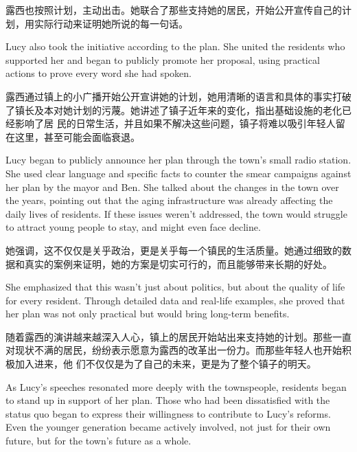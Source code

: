 露西也按照计划，主动出击。她联合了那些支持她的居民，开始公开宣传自己的计划，用实际行动来证明她所说的每一句话。

\begin{flushright}
    Lucy also took the initiative according to the plan. She united the residents
    who supported her and began to publicly promote her proposal, using practical
    actions to prove every word she had spoken.
\end{flushright}

露西通过镇上的小广播开始公开宣讲她的计划，她用清晰的语言和具体的事实打破了镇长及本对她计划的污蔑。她讲述了镇子近年来的变化，指出基础设施的老化已经影响了居
民的日常生活，并且如果不解决这些问题，镇子将难以吸引年轻人留在这里，甚至可能会面临衰退。

\begin{flushright} Lucy began to publicly announce her plan through the
    town's small radio station. She used clear language and specific facts to
    counter the smear campaigns against her plan by the mayor and Ben. She
    talked
    about the changes in the town over the years, pointing out that the aging
    infrastructure was already affecting the daily lives of residents. If these
    issues weren’t addressed, the town would struggle to attract young people
    to
    stay, and might even face decline. \end{flushright}

她强调，这不仅仅是关乎政治，更是关乎每一个镇民的生活质量。她通过细致的数据和真实的案例来证明，她的方案是切实可行的，而且能够带来长期的好处。

\begin{flushright} She emphasized that this wasn’t just about politics, but
    about the quality of life for every resident. Through detailed data and
    real-life examples, she proved that her plan was not only practical but
    would
    bring long-term benefits. \end{flushright}

随着露西的演讲越来越深入人心，镇上的居民开始站出来支持她的计划。那些一直对现状不满的居民，纷纷表示愿意为露西的改革出一份力。而那些年轻人也开始积极加入进来，他
们不仅仅是为了自己的未来，更是为了整个镇子的明天。

\begin{flushright} As Lucy’s speeches resonated more deeply with the
    townspeople, residents began to stand up in support of her plan. Those who
    had
    been dissatisfied with the status quo began to express their willingness to
    contribute to Lucy’s reforms. Even the younger generation became actively
    involved, not just for their own future, but for the town’s future as a
    whole.
\end{flushright}

